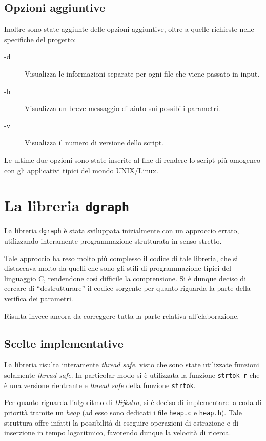 \documentclass[a4paper,10pt]{article}
\begin{document}
\subsection{Opzioni aggiuntive}

Inoltre sono state aggiunte delle opzioni aggiuntive, oltre a quelle richieste nelle specifiche del progetto:
\begin{description}
	\item[-d] Visualizza le informazioni separate per ogni file che viene passato in input.
	\item[-h] Visualizza un breve messaggio di aiuto sui possibili parametri.
	\item[-v] Visualizza il numero di versione dello script.
\end{description}

Le ultime due opzioni sono state inserite al fine di rendere lo script pi\`u omogeneo con gli applicativi tipici del mondo UNIX/Linux.

\section{La libreria \texttt{dgraph}}

La libreria \texttt{dgraph} \`e stata sviluppata inizialmente con un approccio errato, utilizzando interamente programmazione strutturata in senso stretto.

Tale approccio ha reso molto pi\`u complesso il codice di tale libreria, che si distaccava molto da quelli che sono gli stili di programmazione tipici del linguaggio C, rendendone cos\`i difficile la comprensione. Si \`e dunque deciso di cercare di ``destrutturare'' il codice sorgente per quanto riguarda la parte della verifica dei parametri.

Risulta invece ancora da correggere tutta la parte relativa all'elaborazione.

\subsection{Scelte implementative}

La libreria risulta interamente \textit{thread safe}, visto che sono state utilizzate funzioni solamente \textit{thread safe}. In particolar modo si \`e utilizzata la funzione \texttt{strtok\_r} che \`e una versione rientrante e \textit{thread safe} della funzione \texttt{strtok}.

Per quanto riguarda l'algoritmo di \textit{Dijkstra}, si \`e deciso di implementare la coda di priorit\`a tramite un \textit{heap} (ad esso sono dedicati i file \texttt{heap.c} e \texttt{heap.h}). Tale struttura offre infatti la possibilit\`a di eseguire operazioni di estrazione e di inserzione in tempo logaritmico, favorendo dunque la velocit\`a di ricerca.
\end{document}
